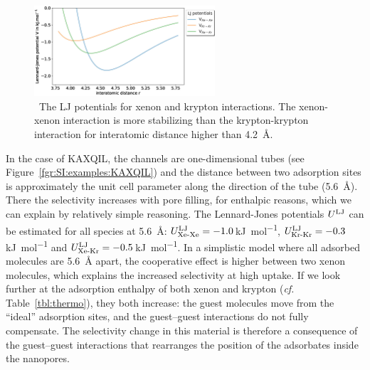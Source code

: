 \documentclass[main.tex]{subfiles}
\begin{document}
\begin{figure}[ht]
  \centering
    \includegraphics[width=0.6\textwidth]{figures/2-thermo/lennard_jones.jpg}
    \caption{\ The LJ potentials for xenon and krypton interactions. The xenon-xenon interaction is more stabilizing than the krypton-krypton interaction for interatomic distance higher than \SI{4.2}{\angstrom}.}\label{fgr:LJ}
  \end{figure}

In the case of KAXQIL, the channels are one-dimensional tubes (see Figure~\ref{fgr:SI:examples:KAXQIL}) and the distance between two adsorption sites is approximately the unit cell parameter along the direction of the tube (\SI{5.6}{\angstrom}). There the selectivity increases with pore filling, for enthalpic reasons, which we can explain by relatively simple reasoning. The Lennard-Jones potentials $U^{\text{LJ}}$ can be estimated for all species at \SI{5.6}{\angstrom}: $U^{\text{LJ}}_{\text{Xe-Xe}}=-1.0$\,\si{\kilo\joule\per\mol}, $U^{\text{LJ}}_{\text{Kr-Kr}}=-0.3$\,\si{\kilo\joule\per\mol} and $U^{\text{LJ}}_{\text{Xe-Kr}}=-0.5$\,\si{\kilo\joule\per\mol}. In a simplistic model where all adsorbed molecules are \SI{5.6}{\angstrom} apart, the cooperative effect is higher between two xenon molecules, which explains the increased selectivity at high uptake. If we look further at the adsorption enthalpy of both xenon and krypton (\emph{cf.} Table~\ref{tbl:thermo}), they both increase: the guest molecules move from the ``ideal'' adsorption sites, and the guest--guest interactions do not fully compensate. The selectivity change in this material is therefore a consequence of the guest--guest interactions that rearranges the position of the adsorbates inside the nanopores.
\end{document}
